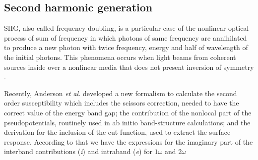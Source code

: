 \documentclass[aps,pra,11pt,tightenlines,showpacs,superscriptaddress,groupedaddress]{revtex4-1}
\begin{document}
    \subsection{Second harmonic generation}

SHG, also called frequency doubling, is a particular case of the nonlinear
optical process of sum of frequency in which photons of same frequency are
annihilated to produce a new photon with twice frequency, energy and half of
wavelength of the initial photons. This phenomena occurs when light beams from
coherent sources inside over a nonlinear media that does not present inversion
of symmetry \cite{bloembergen1962light,anderson2015theory,salazar2014molecular,
sipe2000second}.

Recently, Anderson \emph{et al.} \cite{anderson2015theory} developed a new
formalism to calculate the second order susceptibility which includes the
scissors correction, needed to have the correct value of the energy band gap;
the contribution of the nonlocal part of the pseudopotentials, routinely used
in ab initio band-structure calculations; and the derivation for the inclusion
of the cut function, used to extract the surface response. According to that we
have the expressions for the imaginary part of the interband contributions
(\emph{i}) and intraband (\emph{e}) for $1\omega$ and $2\omega$
\end{document}

